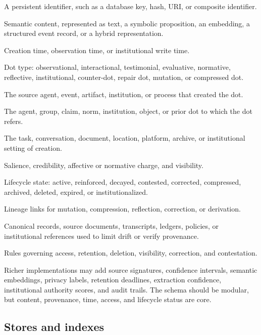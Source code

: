 \documentclass[11pt]{article}
\theoremstyle{remark}
\begin{document}
\begin{description}[leftmargin=3.0cm,style=nextline]
\item[$id$] A persistent identifier, such as a database key, hash, URI, or
composite identifier.
\item[$x$] Semantic content, represented as text, a symbolic proposition,
an embedding, a structured event record, or a hybrid representation.
\item[$\tau$] Creation time, observation time, or institutional write time.
\item[$type$] Dot type: observational, interactional, testimonial,
evaluative, normative, reflective, institutional, counter-dot, repair
dot, mutation, or compressed dot.
\item[$origin$] The source agent, event, artifact, institution, or process
that created the dot.
\item[$target$] The agent, group, claim, norm, institution, object, or
prior dot to which the dot refers.
\item[$context$] The task, conversation, document, location, platform,
archive, or institutional setting of creation.
\item[$\sigma,\gamma,\alpha,\nu$] Salience, credibility, affective or
normative charge, and visibility.
\item[$\ell$] Lifecycle state: active, reinforced, decayed, contested,
corrected, compressed, archived, deleted, expired, or institutionalized.
\item[$parents,children$] Lineage links for mutation, compression,
reflection, correction, or derivation.
\item[$anchors$] Canonical records, source documents, transcripts,
ledgers, policies, or institutional references used to limit drift or
verify provenance.
\item[$permissions$] Rules governing access, retention, deletion,
visibility, correction, and contestation.
\end{description}

Richer implementations may add source signatures, confidence intervals,
semantic embeddings, privacy labels, retention deadlines, extraction
confidence, institutional authority scores, and audit trails. The schema
should be modular, but content, provenance, time, access, and lifecycle
status are core.

\subsection{Stores and indexes}\label{stores-and-indexes}
\end{document}
